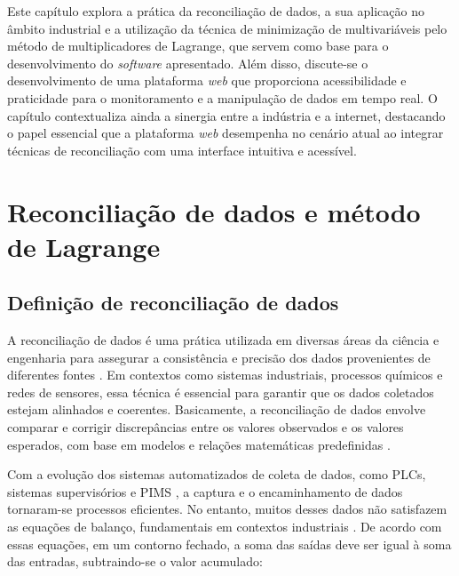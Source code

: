 \label{Cap:ReferencialTeorico}

Este capítulo explora a prática da reconciliação de dados, a sua aplicação no âmbito industrial e a utilização da técnica de minimização de multivariáveis pelo método de multiplicadores de Lagrange, que servem como base para o desenvolvimento do \textit{software} apresentado. Além disso, discute-se o desenvolvimento de uma plataforma \textit{web} que proporciona acessibilidade e praticidade para o monitoramento e a manipulação de dados em tempo real. O capítulo contextualiza ainda a sinergia entre a indústria e a internet, destacando o papel essencial que a plataforma \textit{web} desempenha no cenário atual ao integrar técnicas de reconciliação com uma interface intuitiva e acessível.

\section{Reconciliação de dados e método de Lagrange}

\subsection{Definição de reconciliação de dados}

A reconciliação de dados é uma prática utilizada em diversas áreas da ciência e engenharia para assegurar a consistência e precisão dos dados provenientes de diferentes fontes \cite{datarecshakar}. Em contextos como sistemas industriais, processos químicos e redes de sensores, essa técnica é essencial para garantir que os dados coletados estejam alinhados e coerentes. Basicamente, a reconciliação de dados envolve comparar e corrigir discrepâncias entre os valores observados e os valores esperados, com base em modelos e relações matemáticas predefinidas \cite{datarecragnoli}.

Com a evolução dos sistemas automatizados de coleta de dados, como PLCs, sistemas supervisórios e PIMS \cite{plcsupervisory2021}, a captura e o encaminhamento de dados tornaram-se processos eficientes. No entanto, muitos desses dados não satisfazem as equações de balanço, fundamentais em contextos industriais \cite{balance2020}. De acordo com essas equações, em um contorno fechado, a soma das saídas deve ser igual à soma das entradas, subtraindo-se o valor acumulado:

